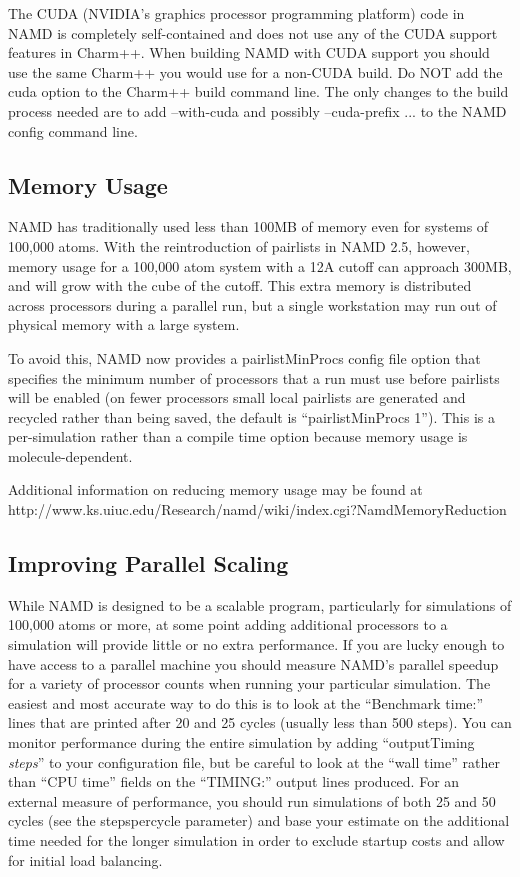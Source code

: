 The CUDA (NVIDIA's graphics processor programming platform) code in
NAMD is completely self-contained and does not use any of the CUDA
support features in Charm++.  When building NAMD with CUDA support
you should use the same Charm++ you would use for a non-CUDA build.
Do NOT add the cuda option to the Charm++ build command line.  The
only changes to the build process needed are to add --with-cuda and
possibly --cuda-prefix ... to the NAMD config command line.

\subsection{Memory Usage}

NAMD has traditionally used less than 100MB of memory even for systems
of 100,000 atoms.  With the reintroduction of pairlists in NAMD 2.5,
however, memory usage for a 100,000 atom system with a 12A cutoff can
approach 300MB, and will grow with the cube of the cutoff.  This extra
memory is distributed across processors during a parallel run, but a
single workstation may run out of physical memory with a large system.

To avoid this, NAMD now provides a pairlistMinProcs config file option
that specifies the minimum number of processors that a run must use
before pairlists will be enabled (on fewer processors small local
pairlists are generated and recycled rather than being saved, the
default is ``pairlistMinProcs 1'').  This is a per-simulation rather than
a compile time option because memory usage is molecule-dependent.

Additional information on reducing memory usage may be found at
http://www.ks.uiuc.edu/Research/namd/wiki/index.cgi?NamdMemoryReduction

\subsection{Improving Parallel Scaling}

While NAMD is designed to be a scalable program, particularly for
simulations of 100,000 atoms or more, at some point adding additional
processors to a simulation will provide little or no extra performance.
If you are lucky enough to have access to a parallel machine you should
measure NAMD's parallel speedup for a variety of processor counts when
running your particular simulation.  The easiest and most accurate way
to do this is to look at the ``Benchmark time:'' lines that are printed
after 20 and 25 cycles (usually less than 500 steps).  You can monitor
performance during the entire simulation by adding ``outputTiming {\em steps}''
to your configuration file, but be careful to look at the ``wall time''
rather than ``CPU time'' fields on the ``TIMING:'' output lines produced.
For an external measure of performance, you should run simulations of
both 25 and 50 cycles (see the stepspercycle parameter) and base your
estimate on the additional time needed for the longer simulation in
order to exclude startup costs and allow for initial load balancing.

